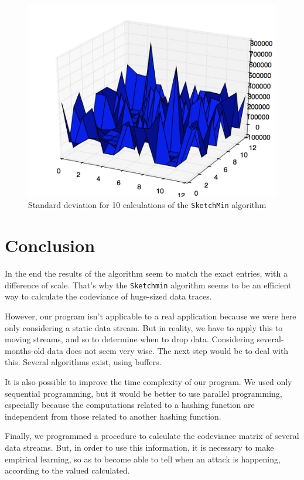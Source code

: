 \documentclass[a4paper]{article}%
\begin{document}
\begin{figure}[H]
	\center
	\includegraphics[scale=0.25]{generated10times.png}
	\caption{\footnotesize Standard deviation for 10 calculations of the \texttt{SketchMin} algorithm}
	\label{ref:exp_artificial_stdev}
\end{figure}


\section*{Conclusion}

In the end the results of the algorithm seem to match the exact entries, with a difference of scale. That's why the \texttt{Sketchmin} algorithm seems to be an efficient way to calculate the codeviance of huge-sized data traces.

However, our program isn't applicable to a real application because we were here only considering a static data stream. But in reality, we have to apply this to moving streams, and so to determine when to drop data. Considering several-months-old data does not seem very wise. The next step would be to deal with this. Several algorithms exist, using buffers.

It is also possible to improve the time complexity of our program. We used only sequential programming, but it would be better to use parallel programming, especially because the computations related to a hashing function are independent from those related to another hashing function.

Finally, we programmed a procedure to calculate the codeviance matrix of several data streams. But, in order to use this information, it is necessary to make empirical learning, so as to become able to tell when an attack is happening, according to the valued calculated.


\clearpage
\end{document}
